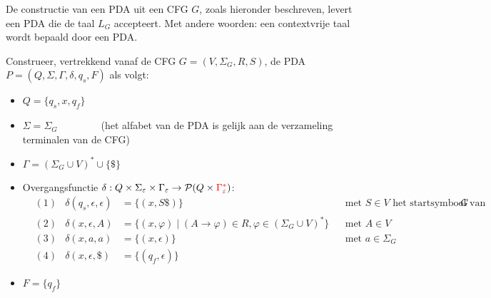 \documentclass[../aanvullingen_cursus.tex]{subfiles}
\begin{document}
\begin{stelling}
	De constructie van een PDA uit een CFG \(G\), zoals hieronder beschreven, levert een PDA die de taal \(L_G\) accepteert. Met andere woorden: een contextvrije taal wordt bepaald door een PDA.

	\hfill

	Construeer, vertrekkend vanaf de CFG \(G=(V,\Sigma_G,R,S)\), de PDA \(P=(Q,\Sigma,\Gamma,\delta,q_s,F)\) als volgt:
	\begin{itemize}
		\item \(Q=\{q_s,x,q_f\}\)
		\item \(\Sigma = \Sigma_G \qquad \qquad\) \scriptsize(het alfabet van de PDA is gelijk aan de verzameling terminalen van de CFG) \normalsize
		\item \(\Gamma = (\Sigma_G \cup V)^* \cup \{\$\}\)
		\item Overgangsfunctie \(\delta:Q\times \Sigma_\epsilon \times \Gamma_\epsilon \to \powerset[Q\times\color{red}\Gamma_\epsilon^*\color{black}]\):
		\begin{align*}
			&(1) & \delta(q_s,\epsilon,\epsilon) &=\{(x,S\$)\} && \text{met \(S\in V\) het startsymbool van }G \\
			&(2) & \delta(x,\epsilon, A) &= \{(x,\varphi) \mid (A\rightarrow\varphi) \in R, \varphi \in (\Sigma_G \cup V)^*\} && \text{met } A \in V \\
			&(3) & \delta(x,a,a) &= \{(x,\epsilon)\} && \text{met } a \in \Sigma_G \\
			&(4) & \delta(x,\epsilon,\$) &= \{(q_f,\epsilon)\}
		\end{align*}
		\item \(F=\{q_f\}\)
	\end{itemize}
\end{stelling}

\newpage
\end{document}
